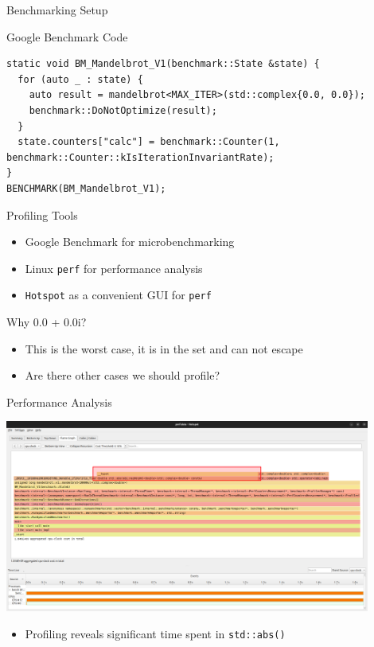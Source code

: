 \documentclass{beamer}
\begin{document}
\begin{frame}[fragile]{Benchmarking Setup}
    \begin{exampleblock}{Google Benchmark Code}
        \begin{verbatim}
static void BM_Mandelbrot_V1(benchmark::State &state) {
  for (auto _ : state) {
    auto result = mandelbrot<MAX_ITER>(std::complex{0.0, 0.0});
    benchmark::DoNotOptimize(result);
  }
  state.counters["calc"] = benchmark::Counter(1, benchmark::Counter::kIsIterationInvariantRate);
}
BENCHMARK(BM_Mandelbrot_V1);
        \end{verbatim}
    \end{exampleblock}

    \begin{block}{Profiling Tools}
        \begin{itemize}
            \item Google Benchmark for microbenchmarking
            \item Linux \texttt{perf} for performance analysis
            \item \texttt{Hotspot} as a convenient GUI for \texttt{perf}
        \end{itemize}
    \end{block}

    \begin{block}{Why 0.0 + 0.0i?}
        \begin{itemize}
            \item This is the worst case, it is in the set and can not escape
            \item Are there other cases we should profile?
        \end{itemize}
    \end{block}
\end{frame}

\begin{frame}{Performance Analysis}
    \begin{center}
        \includegraphics[width=0.9\textwidth]{images/V1_perf.png}
    \end{center}
    \begin{itemize}
        \item Profiling reveals significant time spent in \texttt{std::abs()}
    \end{itemize}
\end{frame}
\end{document}
